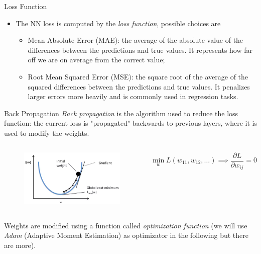 \documentclass{beamer}
\begin{document}
\begin{frame}{Loss Function}
  \begin{itemize}
  \item The NN loss is computed by the \emph{loss function}, possible choices are
    \begin{itemize}
      \item Mean Absolute Error (MAE): the average of the absolute value of the differences between the predictions and true values. It represents how far off we are on average from the correct value;
      \item Root Mean Squared Error (MSE): the square root of the average of the squared differences between the predictions and true values. It penalizes larger errors more heavily and is commonly used in regression tasks.
    \end{itemize}
  \end{itemize}
\end{frame}

\begin{frame}{Back Propagation}
  \emph{Back propagation} is the algorithm used to reduce the loss function: the current loss is "propagated" backwards to previous layers, where it is used to modify the weights.
  \begin{columns}
    \begin{figure}[htb]
      \begin{center}
        \includegraphics[width=0.85\linewidth]{loss_function}
      \end{center}
    \end{figure}
    \begin{equation}
      \min_{w} L(w_{11}, w_{12},\ldots) \implies \frac{\partial L}{\partial w_{ij}} = 0
    \end{equation}
  \end{columns}  
  Weights are modified using a function called \emph{optimization function} (we will use \emph{Adam} (Adaptive Moment Estimation) as optimizator in the following but there are more).
\end{frame}
\end{document}

